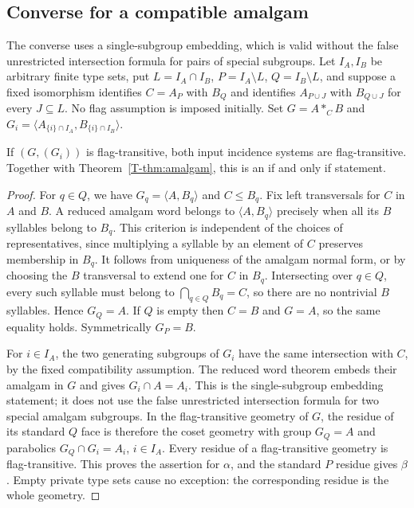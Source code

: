 \subsection*{Converse for a compatible amalgam}
The converse uses a single-subgroup embedding, which is valid without the false unrestricted intersection formula for pairs of special subgroups.
Let $I_A,I_B$ be arbitrary finite type sets, put
$L=I_A\cap I_B$, $P=I_A\setminus L$, $Q=I_B\setminus L$,
and suppose a fixed isomorphism identifies $C=A_P$ with $B_Q$
and identifies $A_{P\cup J}$ with $B_{Q\cup J}$ for every
$J\subseteq L$. No flag assumption is imposed initially.
Set $G=A*_C B$ and
$G_i=\langle A_{\{i\}\cap I_A},B_{\{i\}\cap I_B}\rangle$.

\begin{proposition}\label{F-prop:converse}
If $(G,(G_i))$ is flag-transitive, both input incidence systems are
flag-transitive. Together with Theorem~\ref{T-thm:amalgam}, this is an
if and only if statement.
\end{proposition}
\begin{proof}
For $q\in Q$, we have $G_q=\langle A,B_q\rangle$ and
$C\leq B_q$. Fix left transversals for $C$ in $A$ and $B$.
A reduced amalgam word belongs to $\langle A,B_q\rangle$
precisely when all its $B$ syllables belong to $B_q$. This criterion
is independent of the choices of representatives, since multiplying
a syllable by an element of $C$ preserves membership in $B_q$.
It follows from uniqueness of the amalgam normal form, or by choosing
the $B$ transversal to extend one for $C$ in $B_q$.
Intersecting over $q\in Q$, every such syllable must belong to
$\bigcap_{q\in Q}B_q=C$, so there are no nontrivial $B$
syllables. Hence $G_Q=A$. If $Q$ is empty then $C=B$ and
$G=A$, so the same equality holds. Symmetrically $G_P=B$.

For $i\in I_A$, the two generating subgroups of $G_i$ have the
same intersection with $C$, by the fixed compatibility assumption.
The reduced word theorem embeds their amalgam in $G$ and gives
$G_i\cap A=A_i$. This is the single-subgroup embedding statement;
it does not use the false unrestricted intersection formula for two
special amalgam subgroups. In the flag-transitive geometry of $G$,
the residue of its standard $Q$ face is therefore the coset geometry
with group $G_Q=A$ and parabolics $G_Q\cap G_i=A_i$,
$i\in I_A$. Every residue of a flag-transitive geometry is
flag-transitive. This proves the assertion for $\alpha$, and the
standard $P$ residue gives $\beta$. Empty private type sets cause
no exception: the corresponding residue is the whole geometry.
\end{proof}


